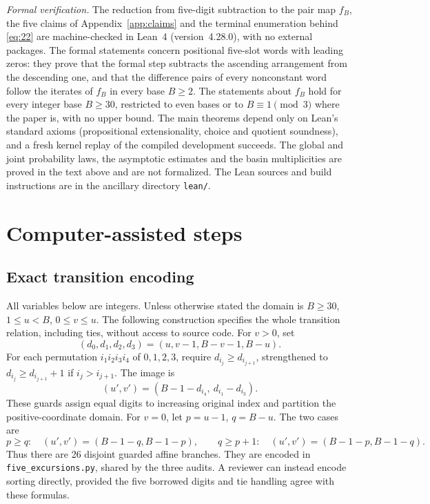 \documentclass[11pt]{amsart}
\begin{document}
\emph{Formal verification.} The reduction from five-digit subtraction to the pair map \(f_B\), the five claims of Appendix~\ref{app:claims} and the terminal enumeration behind \eqref{eq:22} are machine-checked in Lean~4 (version~4.28.0), with no external packages. The formal statements concern positional five-slot words with leading zeros: they prove that the formal step subtracts the ascending arrangement from the descending one, and that the difference pairs of every nonconstant word follow the iterates of \(f_B\) in every base \(B\ge2\). The statements about \(f_B\) hold for every integer base \(B\ge30\), restricted to even bases or to \(B\equiv1\pmod3\) where the paper is, with no upper bound. The main theorems depend only on Lean's standard axioms (propositional extensionality, choice and quotient soundness), and a fresh kernel replay of the compiled development succeeds. The global and joint probability laws, the asymptotic estimates and the basin multiplicities are proved in the text above and are not formalized. The Lean sources and build instructions are in the ancillary directory \texttt{lean/}.

\appendix

\section{Computer-assisted steps}\label{app:steps}

\subsection{Exact transition encoding}

All variables below are integers. Unless otherwise stated the domain is \(B\ge30\), \(1\le u<B\), \(0\le v\le u\). The following construction specifies the whole transition relation, including ties, without access to source code. For \(v>0\), set \[(d_0,d_1,d_2,d_3)=(u,v-1,B-v-1,B-u).\] For each permutation \(i_1i_2i_3i_4\) of \(0,1,2,3\), require \(d_{i_j}\ge d_{i_{j+1}}\), strengthened to \(d_{i_j}\ge d_{i_{j+1}}+1\) if \(i_j>i_{j+1}\). The image is \[(u',v')=(B-1-d_{i_4},\ d_{i_1}-d_{i_3}).\] These guards assign equal digits to increasing original index and partition the positive-coordinate domain. For \(v=0\), let \(p=u-1\), \(q=B-u\). The two cases are \[p\ge q:\quad(u',v')=(B-1-q,B-1-p),\qquad
 q\ge p+1:\quad(u',v')=(B-1-p,B-1-q).\] Thus there are 26 disjoint guarded affine branches. They are encoded in \texttt{five\_excursions.py}, shared by the three audits. A reviewer can instead encode sorting directly, provided the five borrowed digits and tie handling agree with these formulas.
\end{document}
